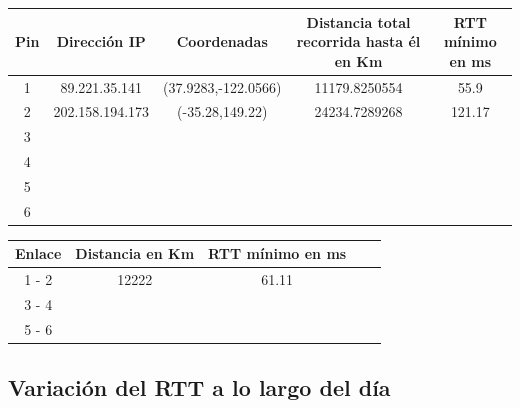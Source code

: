 \noindent \begin{center} \begin{tabular}{| c | c | c | c | c |} \hline 
Pin 	 & 	 Dirección IP 	 & 	 Coordenadas 	 & 	 Distancia total recorrida hasta él en Km 	 & 	 RTT mínimo en ms \\ \hline 
1 	 & 	 89.221.35.141 	 & 	 (37.9283,-122.0566) 	 & 	 11179.8250554 	 & 	 55.9 \\ \hline 
2 	 & 	 202.158.194.173 	 & 	 (-35.28,149.22) 	 & 	 24234.7289268 	 & 	 121.17 \\ \hline 
3 	 & 	  	 & 	  	 & 	  	 & 	  \\ \hline 
4 	 & 	  	 & 	  	 & 	  	 & 	  \\ \hline 
5 	 & 	  	 & 	  	 & 	  	 & 	  \\ \hline 
6 	 & 	  	 & 	  	 & 	  	 & 	  \\ \hline 
\end{tabular} \end{center}

\noindent \begin{center} \begin{tabular}{| c | c | c | c | c |} \hline 
Enlace 	 &	Distancia en Km 	& 	RTT mínimo en ms	\\ \hline 
1 - 2	 &	12222	 	 		& 	61.11				\\ \hline 
3 - 4 	 & 		 				& 					\\ \hline 
5 - 6 	 & 			 			&					\\ \hline 
\end{tabular} \end{center}

\subsection{Variación del RTT a lo largo del día}

